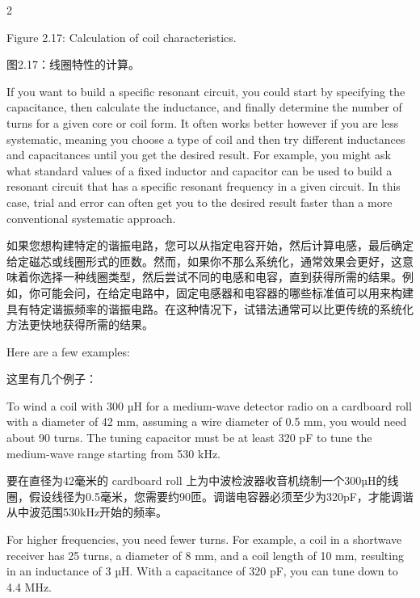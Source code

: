 \documentclass{ctexbook}
\begin{document}
\begin{paracol}{2}
\switchcolumn*

Figure 2.17: Calculation of coil characteristics. 

\switchcolumn

图2.17：线圈特性的计算。

\switchcolumn*

If you want to build a specific resonant circuit, you could start by specifying the capacitance, then calculate the inductance, and finally determine the number of turns for a given 
core or coil form. It often works better however if you are less systematic, meaning you 
choose a type of coil and then try different inductances and capacitances until you get the 
desired result. For example, you might ask what standard values of a fixed inductor and 
capacitor can be used to build a resonant circuit that has a specific resonant frequency in a 
given circuit. In this case, trial and error can often get you to the desired result faster than 
a more conventional systematic approach. 

\switchcolumn

如果您想构建特定的谐振电路，您可以从指定电容开始，然后计算电感，最后确定给定磁芯或线圈形式的匝数。然而，如果你不那么系统化，通常效果会更好，这意味着你选择一种线圈类型，然后尝试不同的电感和电容，直到获得所需的结果。例如，你可能会问，在给定电路中，固定电感器和电容器的哪些标准值可以用来构建具有特定谐振频率的谐振电路。在这种情况下，试错法通常可以比更传统的系统化方法更快地获得所需的结果。

\switchcolumn*

Here are a few examples: 

\switchcolumn

这里有几个例子：

\switchcolumn*

To wind a coil with 300 µH for a medium-wave detector radio on a cardboard roll with a 
diameter of 42 mm, assuming a wire diameter of 0.5 mm, you would need about 90 turns. 
The tuning capacitor must be at least 320 pF to tune the medium-wave range starting from 
530 kHz. 

\switchcolumn

要在直径为42毫米的 cardboard roll 上为中波检波器收音机绕制一个300µH的线圈，假设线径为0.5毫米，您需要约90匝。调谐电容器必须至少为320pF，才能调谐从中波范围530kHz开始的频率。

\switchcolumn*

For higher frequencies, you need fewer turns. For example, a coil in a shortwave receiver 
has 25 turns, a diameter of 8 mm, and a coil length of 10 mm, resulting in an inductance 
of 3 µH. With a capacitance of 320 pF, you can tune down to 4.4 MHz. 


\end{paracol}
\end{document}
